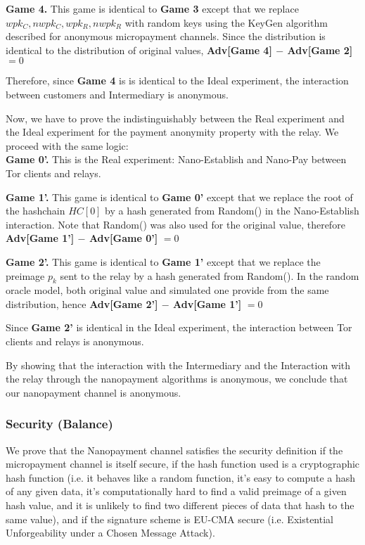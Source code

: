 \textbf{Game 4.} This game is identical to \textbf{Game 3} except that we replace $wpk_C, nwpk_C, wpk_R, nwpk_R$ with random keys using the KeyGen algorithm described for anonymous micropayment channels. Since the distribution is identical to the distribution of original values, \textbf{Adv[Game 4] $-$ Adv[Game 2]} $= 0$

Therefore, since \textbf{Game 4} is is identical to the Ideal experiment, the interaction between customers and Intermediary is anonymous.

Now, we have to prove the indistinguishably between the Real experiment and the Ideal experiment for the payment anonymity property with the relay.  We proceed with the same logic:\\

\textbf{Game 0'.} This is the Real experiment: Nano-Establish and Nano-Pay between  Tor clients and relays.

\textbf{Game 1'.} This game is identical to \textbf{Game 0'} except that we replace the root of the hashchain $HC[0]$ by a hash generated from Random() in the Nano-Establish interaction. Note that Random() was also used for the original value, therefore \textbf{Adv[Game 1'] $-$ Adv[Game 0']} $= 0$

\textbf{Game 2'.} This game is identical to \textbf{Game 1'} except that we replace the preimage $p_k$ sent to the relay by a hash generated from Random(). In the random oracle model, both original value and simulated one provide from the same distribution, hence \textbf{Adv[Game 2'] $-$ Adv[Game 1']} $= 0$

Since \textbf{Game 2'} is identical in the Ideal experiment, the interaction between Tor clients and relays is anonymous.

By showing that the interaction with the Intermediary and the Interaction with the relay through the nanopayment algorithms is anonymous, we conclude that our nanopayment channel is anonymous.

\subsubsection{Security (Balance)}

We prove that the Nanopayment channel satisfies the security definition if the micropayment channel is itself secure, if the hash function used is a cryptographic hash function (i.e. it behaves like a random function, it's easy to compute a hash of any given data, it's computationally hard to find a valid preimage of a given hash value, and it is unlikely to find two different pieces of data that hash to the same value), and if the signature scheme is EU-CMA secure (i.e. Existential Unforgeability under a Chosen Message Attack).

